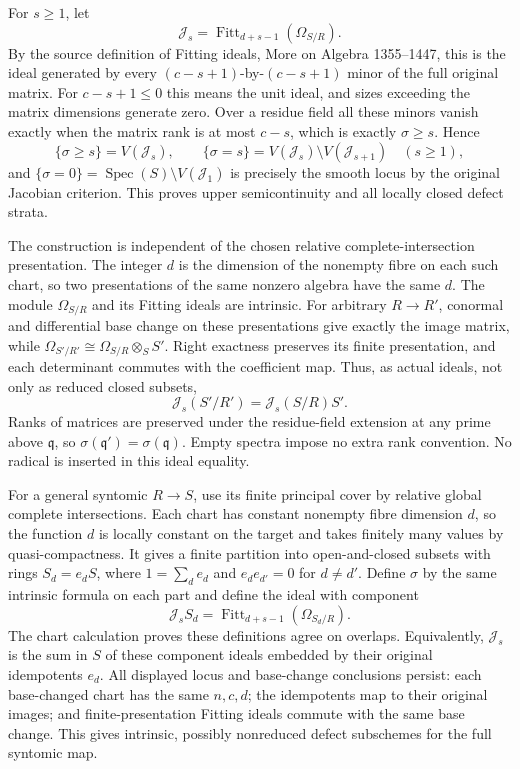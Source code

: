 For \(s\ge1\), let \[
\mathcal J_s=\operatorname{Fitt}_{d+s-1}(\Omega_{S/R}).
\] By the source definition of Fitting ideals, More on Algebra 1355--1447, this is the ideal generated by every \((c-s+1)\)-by-\((c-s+1)\) minor of the full original matrix. For \(c-s+1\le0\) this means the unit ideal, and sizes exceeding the matrix dimensions generate zero. Over a residue field all these minors vanish exactly when the matrix rank is at most \(c-s\), which is exactly \(\sigma\ge s\). Hence \[
\{\sigma\ge s\}=V(\mathcal J_s),\qquad
\{\sigma=s\}=V(\mathcal J_s)\setminus V(\mathcal J_{s+1})\quad(s\ge1),
\] and \(\{\sigma=0\}=\operatorname{Spec}(S)\setminus V(\mathcal J_1)\) is precisely the smooth locus by the original Jacobian criterion. This proves upper semicontinuity and all locally closed defect strata.

The construction is independent of the chosen relative complete-intersection presentation. The integer \(d\) is the dimension of the nonempty fibre on each such chart, so two presentations of the same nonzero algebra have the same \(d\). The module \(\Omega_{S/R}\) and its Fitting ideals are intrinsic. For arbitrary \(R\to R'\), conormal and differential base change on these presentations give exactly the image matrix, while \(\Omega_{S'/R'}\cong\Omega_{S/R}\otimes_SS'\). Right exactness preserves its finite presentation, and each determinant commutes with the coefficient map. Thus, as actual ideals, not only as reduced closed subsets, \[
\mathcal J_s(S'/R')=\mathcal J_s(S/R)S'.
\] Ranks of matrices are preserved under the residue-field extension at any prime above \(\mathfrak q\), so \(\sigma(\mathfrak q')=\sigma(\mathfrak q)\). Empty spectra impose no extra rank convention. No radical is inserted in this ideal equality.

For a general syntomic \(R\to S\), use its finite principal cover by relative global complete intersections. Each chart has constant nonempty fibre dimension \(d\), so the function \(d\) is locally constant on the target and takes finitely many values by quasi-compactness. It gives a finite partition into open-and-closed subsets with rings \(S_d=e_dS\), where \(1=\sum_d e_d\) and \(e_de_{d'}=0\) for \(d\ne d'\). Define \(\sigma\) by the same intrinsic formula on each part and define the ideal with component \[
\mathcal J_sS_d=\operatorname{Fitt}_{d+s-1}(\Omega_{S_d/R}).
\] The chart calculation proves these definitions agree on overlaps. Equivalently, \(\mathcal J_s\) is the sum in \(S\) of these component ideals embedded by their original idempotents \(e_d\). All displayed locus and base-change conclusions persist: each base-changed chart has the same \(n,c,d\); the idempotents map to their original images; and finite-presentation Fitting ideals commute with the same base change. This gives intrinsic, possibly nonreduced defect subschemes for the full syntomic map.

